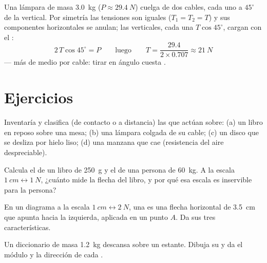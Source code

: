 \begin{example}\label{ex:g10:inertia:lamp}
Una lámpara de masa \qty{3.0}{kg} ($P \approx \qty{29.4}{N}$) cuelga de
dos cables, cada uno a $45^\circ$ de la vertical. Por simetría las
tensiones son iguales ($T_1 = T_2 = T$) y sus componentes horizontales
se anulan; las verticales, cada una $T \cos 45^\circ$, cargan con el
:
\[
2\,T \cos 45^\circ = P
\qquad\text{luego}\qquad
T = \frac{29.4}{2 \times 0.707} \approx \qty{21}{N}
\]
--- más de medio  por cable: tirar en ángulo cuesta .
\end{example}

\section{Ejercicios}

\begin{exercise}[$\star$]\label{exo:g10:inertia:1}
Inventaría y clasifica (de contacto o a distancia) las  que
actúan sobre: (a) un libro en reposo sobre una mesa; (b) una lámpara
colgada de su cable; (c) un disco que se desliza por hielo liso; (d) una
manzana que cae (resistencia del aire despreciable).
\end{exercise}

\begin{exercise}[$\star$]\label{exo:g10:inertia:2}
Calcula el  de un libro de \qty{250}{g} y el de una persona de
\qty{60}{kg}. A la escala $\qty{1}{cm} \leftrightarrow \qty{1}{N}$,
¿cuánto mide la flecha del libro, y por qué esa escala es inservible
para la persona?
\end{exercise}

\begin{exercise}[$\star$]\label{exo:g10:inertia:3}
En un diagrama a la escala $\qty{1}{cm} \leftrightarrow \qty{2}{N}$, una
 es una flecha horizontal de \qty{3.5}{cm} que apunta hacia la
izquierda, aplicada en un punto $A$. Da sus tres características.
\end{exercise}

\begin{exercise}[$\star$]\label{exo:g10:inertia:4}
Un diccionario de masa \qty{1.2}{kg} descansa sobre un estante. Dibuja
su  y da el módulo y la dirección de cada .
\end{exercise}

